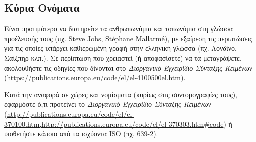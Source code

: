 \subsection{Κύρια Ονόματα}
Είναι προτιμότερο να διατηρείτε τα ανθρωπωνύμια και τοπωνύμια στη γλώσσα
προέλευσής τους (πχ. Steve Jobs, Stéphane Mallarmé), με εξαίρεση τις περιπτώσεις για τις
οποίες υπάρχει καθιερωμένη γραφή στην ελληνική γλώσσα (πχ. Λονδίνο, Σαίξπηρ κλπ.).
Σε περίπτωση που χρειαστεί (ή αποφασίσετε) να τα μεταγράψετε, ακολουθήστε τις οδηγίες
που δίνονται στο \emph{Διοργανικό Εγχειρίδιο Σύνταξης Κειμένων}
(\url{https://publications.europa.eu/code/el/el-4100500el.htm}).

Κατά την αναφορά σε χώρες και νομίσματα (κυρίως στις συντομογραφίες τους),
εφαρμόστε ό,τι προτείνει το \emph{Διοργανικό Εγχειρίδιο Σύνταξης Κειμένων}
(\url{http://publications.europa.eu/code/el/el-
370100.htm,http://publications.europa.eu/code/el/el-370303.htm#code})
ή υιοθετήστε κάποιο από τα ισχύοντα ISO (πχ. 639-2).

